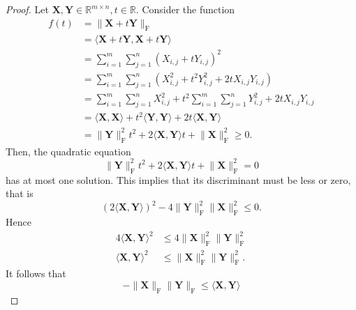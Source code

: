 \documentclass{article}
\theoremstyle{plain}
\begin{document}
\begin{proof}
	Let
	\begin{math}
		\bm{X} , \bm{Y} \in \mathbb{R}^{m \times n} , t \in \mathbb{R} .
	\end{math}
	Consider the function
	\begin{equation*}
		\begin{split}
			f(t) &= \lVert \bm{X} + t \bm{Y} \rVert_{\mathrm{F}} \\
			&= \langle \bm{X} + t \bm{Y} , \bm{X} + t \bm{Y} \rangle \\
			&= \sum_{i=1}^m \sum_{j=1}^n (X_{i,j} + t Y_{i,j})^2 \\
			&= \sum_{i=1}^m \sum_{j=1}^n (X_{i,j}^2 + t^2 Y_{i,j}^2 + 2 t X_{i,j} Y_{i,j}) \\
			&= \sum_{i=1}^m \sum_{j=1}^n X_{i,j}^2 + t^2 \sum_{i=1}^m \sum_{j=1}^n Y_{i,j}^2
			+ 2 t X_{i,j} Y_{i,j} \\
			&= \langle \bm{X} , \bm{X} \rangle + t^2 \langle \bm{Y} , \bm{Y} \rangle 
			+ 2 t \langle \bm{X} , \bm{Y} \rangle \\
			&= \lVert \bm{Y} \rVert_{\mathrm{F}}^2 t^2 + 2 \langle \bm{X} , \bm{Y} \rangle t
			+ \lVert \bm{X} \rVert_{\mathrm{F}}^2 \geq 0 .
		\end{split}
	\end{equation*}
	Then, the quadratic equation
	\begin{equation*}
		\lVert \bm{Y} \rVert_{\mathrm{F}}^2 t^2 + 2 \langle \bm{X} , \bm{Y} \rangle t + \lVert \bm{X} \rVert_{\mathrm{F}}^2 = 0
	\end{equation*}
	has at most one solution. This implies that its discriminant must be less or zero, that is
	\begin{equation*}
		(2 \langle \bm{X} , \bm{Y} \rangle)^2 - 4 \lVert \bm{Y} \rVert_{\mathrm{F}}^2 \lVert \bm{X} \rVert_{\mathrm{F}}^2
		\leq 0 .
	\end{equation*}
	Hence
	\begin{equation*}
		\begin{split}
			4 \langle \bm{X} , \bm{Y} \rangle^2 &\leq 4 \lVert \bm{X} \rVert_{\mathrm{F}}^2 \lVert \bm{Y} \rVert_{\mathrm{F}}^2 \\
			\langle \bm{X} , \bm{Y} \rangle^2 &\leq \lVert \bm{X} \rVert_{\mathrm{F}}^2 \lVert \bm{Y} \rVert_{\mathrm{F}}^2 .
		\end{split}
	\end{equation*}
	It follows that
	\begin{equation*}
		- \lVert \bm{X} \rVert_{\mathrm{F}} \lVert \bm{Y} \rVert_{\mathrm{F}} \leq \langle \bm{X} , \bm{Y} \rangle

\end{equation*}
\end{proof}
\end{document}
